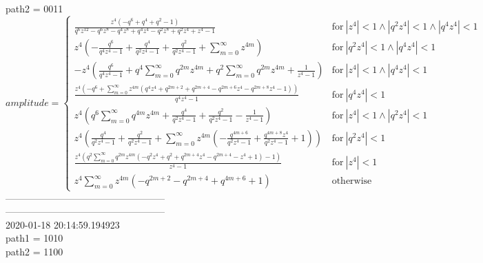 path2 = 0011\\
$$amplitude = \begin{cases} \frac{z^{4} \left(- q^{6} + q^{4} + q^{2} - 1\right)}{q^{6} z^{12} - q^{6} z^{8} - q^{4} z^{8} + q^{4} z^{4} - q^{2} z^{8} + q^{2} z^{4} + z^{4} - 1} & \text{for}\: \left|{z^{4}}\right| < 1 \wedge \left|{q^{2} z^{4}}\right| < 1 \wedge \left|{q^{4} z^{4}}\right| < 1 \\z^{4} \left(- \frac{q^{6}}{q^{4} z^{4} - 1} + \frac{q^{4}}{q^{2} z^{4} - 1} + \frac{q^{2}}{q^{2} z^{4} - 1} + \sum_{m=0}^{\infty} z^{4 m}\right) & \text{for}\: \left|{q^{2} z^{4}}\right| < 1 \wedge \left|{q^{4} z^{4}}\right| < 1 \\- z^{4} \left(\frac{q^{6}}{q^{4} z^{4} - 1} + q^{4} \sum_{m=0}^{\infty} q^{2 m} z^{4 m} + q^{2} \sum_{m=0}^{\infty} q^{2 m} z^{4 m} + \frac{1}{z^{4} - 1}\right) & \text{for}\: \left|{z^{4}}\right| < 1 \wedge \left|{q^{4} z^{4}}\right| < 1 \\\frac{z^{4} \left(- q^{6} + \sum_{m=0}^{\infty} z^{4 m} \left(q^{4} z^{4} + q^{2 m + 2} + q^{2 m + 4} - q^{2 m + 6} z^{4} - q^{2 m + 8} z^{4} - 1\right)\right)}{q^{4} z^{4} - 1} & \text{for}\: \left|{q^{4} z^{4}}\right| < 1 \\z^{4} \left(q^{6} \sum_{m=0}^{\infty} q^{4 m} z^{4 m} + \frac{q^{4}}{q^{2} z^{4} - 1} + \frac{q^{2}}{q^{2} z^{4} - 1} - \frac{1}{z^{4} - 1}\right) & \text{for}\: \left|{z^{4}}\right| < 1 \wedge \left|{q^{2} z^{4}}\right| < 1 \\z^{4} \left(\frac{q^{4}}{q^{2} z^{4} - 1} + \frac{q^{2}}{q^{2} z^{4} - 1} + \sum_{m=0}^{\infty} z^{4 m} \left(- \frac{q^{4 m + 6}}{q^{2} z^{4} - 1} + \frac{q^{4 m + 8} z^{4}}{q^{2} z^{4} - 1} + 1\right)\right) & \text{for}\: \left|{q^{2} z^{4}}\right| < 1 \\\frac{z^{4} \left(q^{2} \sum_{m=0}^{\infty} q^{2 m} z^{4 m} \left(- q^{2} z^{4} + q^{2} + q^{2 m + 4} z^{4} - q^{2 m + 4} - z^{4} + 1\right) - 1\right)}{z^{4} - 1} & \text{for}\: \left|{z^{4}}\right| < 1 \\z^{4} \sum_{m=0}^{\infty} z^{4 m} \left(- q^{2 m + 2} - q^{2 m + 4} + q^{4 m + 6} + 1\right) & \text{otherwise} \end{cases}$$
--------------------------------------------------\\
--------------------------------------------------\\
2020-01-18 20:14:59.194923\\
path1 = 1010\\
path2 = 1100\\
